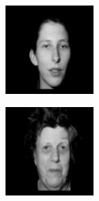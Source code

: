 \begin{figure}[ht]
\begin{subfigure}[b]{0.15\textwidth}
  \end{subfigure}
  \hfill
  \begin{subfigure}[b]{0.15\textwidth}
    \centering
    \includegraphics[width=\textwidth]{images/q3_face_3a.png}
  \end{subfigure}
  \hfill
  \begin{subfigure}[b]{0.15\textwidth}
    \centering
    \includegraphics[width=\textwidth]{images/q3_face_4a.png}

\end{subfigure}
\end{figure}
